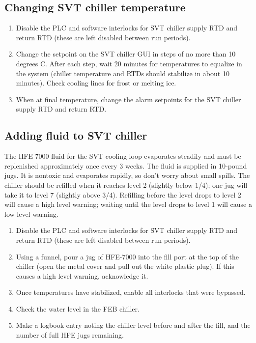 \subsection{Changing SVT chiller temperature}
\label{sec:proc_svt_chiller_tempchange}
\begin{enumerate}
    \item Disable the PLC and software interlocks for SVT chiller supply RTD and return RTD (these are left disabled between run periods).
    \item Change the setpoint on the SVT chiller GUI in steps of no more than 10 degrees C.
        After each step, wait 20 minutes for temperatures to equalize in the system (chiller temperature and RTDs should stabilize in about 10 minutes).
        Check cooling lines for frost or melting ice.
    \item When at final temperature, change the alarm setpoints for the SVT chiller supply RTD and return RTD.
\end{enumerate}

\subsection{Adding fluid to SVT chiller}
\label{sec:proc_svt_chiller_refill}
The HFE-7000 fluid for the SVT cooling loop evaporates steadily and must be replenished approximately once every 3 weeks.
The fluid is supplied in 10-pound jugs. It is nontoxic and evaporates rapidly, so don't worry about small spills.
The chiller should be refilled when it reaches level 2 (slightly below 1/4); one jug will take it to level 7 (slightly above 3/4).
Refilling before the level drops to level 2 will cause a high level warning; waiting until the level drops to level 1 will cause a low level warning.

\begin{enumerate}
    \item Disable the PLC and software interlocks for SVT chiller supply RTD and return RTD (these are left disabled between run periods).
    \item Using a funnel, pour a jug of HFE-7000 into the fill port at the top of the chiller (open the metal cover and pull out the white plastic plug). If this causes a high level warning, acknowledge it.
    \item Once temperatures have stabilized, enable all interlocks that were bypassed.
    \item Check the water level in the FEB chiller.
    \item Make a logbook entry noting the chiller level before and after the fill, and the number of full HFE jugs remaining.
\end{enumerate}

